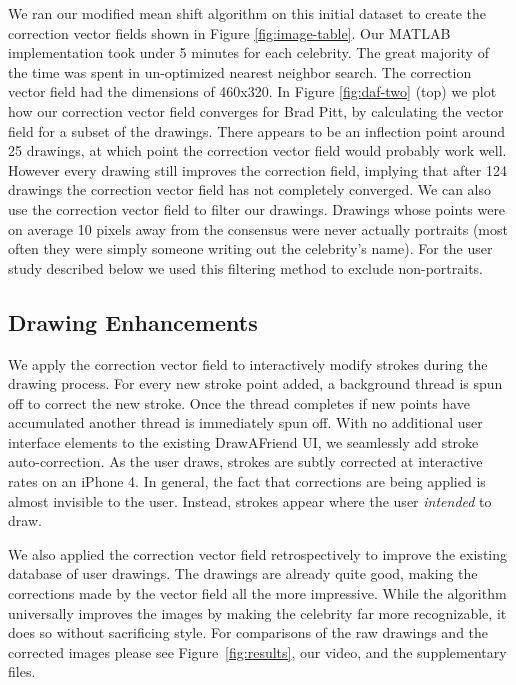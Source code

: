 We ran our modified mean shift algorithm on this initial dataset to create the correction vector fields shown in Figure \ref{fig:image-table}. Our MATLAB implementation took under 5 minutes for each celebrity.  The great majority of the time was spent in un-optimized nearest neighbor search. The correction vector field had the dimensions of 460x320. In Figure \ref{fig:daf-two} (top) we plot how our correction vector field converges for Brad Pitt, by calculating the vector field for a subset of the drawings. There appears to be an inflection point around 25 drawings, at which point the correction vector field would probably work well. However every drawing still improves the correction field, implying that after 124 drawings the correction vector field has not completely converged. We can also use the correction vector field to filter our drawings. Drawings whose points were on average 10 pixels away from the consensus were never actually portraits (most often they were simply someone writing out the celebrity's name). For the user study described below we used this filtering method to exclude non-portraits. 


\subsection {Drawing Enhancements}

We apply the correction vector field to interactively modify strokes during the drawing process. For every new stroke point added, a background thread is spun off to correct the new stroke. Once the thread completes if new points have accumulated another thread is immediately spun off. With no additional user interface elements to the existing DrawAFriend UI, we seamlessly add stroke auto-correction. As the user draws, strokes are subtly corrected at interactive rates on an iPhone 4. In general, the fact that corrections are being applied is almost invisible to the user. Instead, strokes appear where the user {\em intended} to draw.


We also applied the correction vector field retrospectively to improve the existing database of user drawings. The drawings are already quite good, making the corrections made by the vector field all the more impressive.  While the algorithm universally improves the images by making the celebrity far more recognizable, it does so without sacrificing style. For comparisons of the raw drawings and the corrected images please see Figure~\ref{fig:results}, our video, and the supplementary files.

